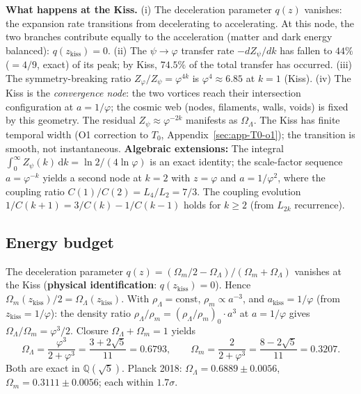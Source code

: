 \documentclass[12pt,a4paper]{article}
\begin{document}
\textbf{What happens at the Kiss.} (i) The deceleration parameter $q(z)$ vanishes: the expansion rate transitions from decelerating to accelerating. At this node, the two branches contribute equally to the acceleration (matter and dark energy balanced): $q(z_{\mathrm{kiss}}) = 0$. (ii) The $\psi \to \varphi$ transfer rate $-dZ_\psi/dk$ has fallen to $44\%$ ($= 4/9$, exact) of its peak; by Kiss, $74.5\%$ of the total transfer has occurred. (iii) The symmetry-breaking ratio $Z_\varphi/Z_\psi = \varphi^{4k}$ is $\varphi^4 \approx 6.85$ at $k=1$ (Kiss). (iv) The Kiss is the \emph{convergence node}: the two vortices reach their intersection configuration at $a = 1/\varphi$; the cosmic web (nodes, filaments, walls, voids) is fixed by this geometry. The residual $Z_\psi \approx \varphi^{-2k}$ manifests as $\Omega_\Lambda$. The Kiss has finite temporal width (O1 correction to $T_0$, Appendix~\ref{sec:app-T0-o1}); the transition is smooth, not instantaneous. \textbf{Algebraic extensions:} The integral $\int_0^\infty Z_\psi(k)\,\mathrm{d}k = \ln 2/(4\ln\varphi)$ is an exact identity; the scale-factor sequence $a = \varphi^{-k}$ yields a second node at $k=2$ with $z = \varphi$ and $a = 1/\varphi^2$, where the coupling ratio $C(1)/C(2) = L_4/L_2 = 7/3$. The coupling evolution $1/C(k+1) = 3/C(k) - 1/C(k-1)$ holds for $k \geq 2$ (from $L_{2k}$ recurrence).

\subsection{Energy budget}
The deceleration parameter $q(z) = (\Omega_m/2 - \Omega_\Lambda)/(\Omega_m + \Omega_\Lambda)$ vanishes at the Kiss (\textbf{physical identification}: $q(z_{\mathrm{kiss}}) = 0$). Hence $\Omega_m(z_{\mathrm{kiss}})/2 = \Omega_\Lambda(z_{\mathrm{kiss}})$. With $\rho_\Lambda = \mathrm{const}$, $\rho_m \propto a^{-3}$, and $a_{\mathrm{kiss}} = 1/\varphi$ (from $z_{\mathrm{kiss}} = 1/\varphi$): the density ratio $\rho_\Lambda/\rho_m = (\rho_\Lambda/\rho_m)_0 \cdot a^3$ at $a = 1/\varphi$ gives $\Omega_\Lambda/\Omega_m = \varphi^3/2$. Closure $\Omega_\Lambda + \Omega_m = 1$ yields
\begin{equation}
\Omega_\Lambda = \frac{\varphi^3}{2+\varphi^3} = \frac{3+2\sqrt{5}}{11} = 0.6793, \qquad \Omega_m = \frac{2}{2+\varphi^3} = \frac{8-2\sqrt{5}}{11} = 0.3207.
\end{equation}
Both are exact in $\mathbb{Q}(\sqrt{5})$. Planck 2018: $\Omega_\Lambda = 0.6889 \pm 0.0056$, $\Omega_m = 0.3111 \pm 0.0056$; each within $1.7\sigma$.
\end{document}
